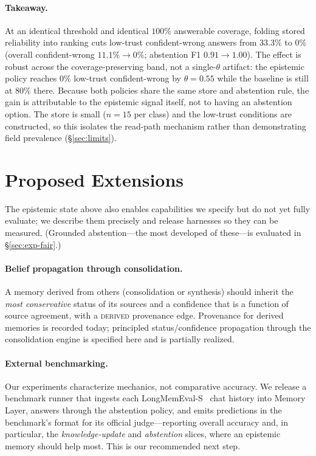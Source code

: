 \documentclass[11pt]{article}
\theoremstyle{definition}
\newcommand{\status}[1]{\textsc{#1}}
\begin{document}
\paragraph{Takeaway.}
At an identical threshold and identical $100\%$ answerable coverage, folding
stored reliability into ranking cuts low-trust confident-wrong answers from
$33.3\%$ to $0\%$ (overall confident-wrong $11.1\%\!\rightarrow\!0\%$; abstention
F1 $0.91\!\rightarrow\!1.00$). The effect is robust across the
coverage-preserving band, not a single-$\theta$ artifact: the epistemic policy
reaches $0\%$ low-trust confident-wrong by $\theta{=}0.55$ while the baseline is
still at $80\%$ there. Because both policies share the same store and abstention
rule, the gain is attributable to the epistemic signal itself, not to having an
abstention option. The store is small ($n{=}15$ per class) and the low-trust
conditions are constructed, so this isolates the read-path mechanism rather than
demonstrating field prevalence (\S\ref{sec:limits}).

\section{Proposed Extensions}\label{sec:extensions}
The epistemic state above also enables capabilities we specify but do not yet
fully evaluate; we describe them precisely and release harnesses so they can be
measured. (Grounded abstention---the most developed of these---is evaluated in
\S\ref{sec:exp-fair}.)

\paragraph{Belief propagation through consolidation.}
A memory derived from others (consolidation or synthesis) should inherit the
\emph{most conservative} status of its sources and a confidence that is a
function of source agreement, with a \status{derived} provenance edge. Provenance
for derived memories is recorded today; principled status/confidence propagation
through the consolidation engine is specified here and is partially realized.

\paragraph{External benchmarking.}
Our experiments characterize mechanics, not comparative accuracy. We release a
benchmark runner that ingests each LongMemEval-S~\cite{longmemeval}
chat history into Memory Layer, answers through the abstention policy, and emits
predictions in the benchmark's format for its official judge---reporting overall
accuracy and, in particular, the \emph{knowledge-update} and \emph{abstention}
slices, where an epistemic memory should help most. This is our recommended next
step.
\end{document}
